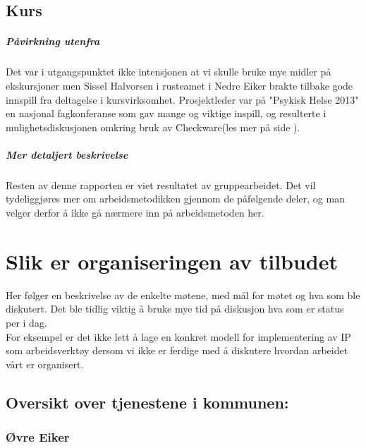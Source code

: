 \documentclass[11pt]{report} %
\begin{document}
                  \section{Kurs}
                    \paragraph{Påvirkning utenfra\\}
                      Det var i utgangspunktet ikke intensjonen at vi skulle bruke mye midler på ekskursjoner men Sissel Halvorsen i rusteamet i Nedre Eiker brakte tilbake gode innspill fra deltagelse i kursvirksomhet. Prosjektleder var på "Psykisk Helse 2013" en nasjonal fagkonferanse som gav mange og viktige inspill, og resulterte i mulighetsdiskusjonen omkring bruk av Checkware(les mer på side \pageref{sec:agr_6}).
                    \paragraph{Mer detaljert beskrivelse\\}
                      Resten av denne rapporten er viet resultatet av gruppearbeidet. Det vil tydeliggjøres mer om arbeidsmetodikken gjennom de påfølgende deler, og man velger derfor å ikke gå nærmere inn på arbeidsmetoden her.  

                \chapter{Slik er organiseringen av tilbudet}\label{chap:org}
                  Her følger en beskrivelse av de enkelte møtene, med mål for møtet og hva som ble diskutert. Det ble tidlig viktig å bruke mye tid på diskusjon hva som er status per i dag.\\
                  For eksempel er det ikke lett å lage en konkret modell for implementering av IP som arbeidsverktøy dersom vi ikke er ferdige med å diskutere hvordan arbeidet vårt er organisert.\\

                  \section{Oversikt over tjenestene i kommunen:}
                   
                  \subsection{Øvre Eiker}\label{sec:org_oek}
                      
\end{document}
